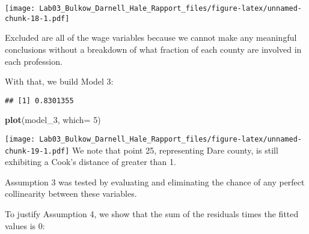 \documentclass[]{article}
\newenvironment{Shaded}{\begin{snugshade}}{\end{snugshade}}
\newcommand{\KeywordTok}[1]{\textcolor[rgb]{0.13,0.29,0.53}{\textbf{#1}}}
\newcommand{\DataTypeTok}[1]{\textcolor[rgb]{0.13,0.29,0.53}{#1}}
\newcommand{\DecValTok}[1]{\textcolor[rgb]{0.00,0.00,0.81}{#1}}
\newcommand{\StringTok}[1]{\textcolor[rgb]{0.31,0.60,0.02}{#1}}
\newcommand{\CommentTok}[1]{\textcolor[rgb]{0.56,0.35,0.01}{\textit{#1}}}
\newcommand{\OperatorTok}[1]{\textcolor[rgb]{0.81,0.36,0.00}{\textbf{#1}}}
\newcommand{\NormalTok}[1]{#1}
\begin{document}
\texttt{[image: Lab03\_Bulkow\_Darnell\_Hale\_Rapport\_files/figure-latex/unnamed-chunk-18-1.pdf]}

Excluded are all of the wage variables because we cannot make any
meaningful conclusions without a breakdown of what fraction of each
county are involved in each profession.

With that, we build Model 3:

\begin{Shaded}
\end{Shaded}

\begin{verbatim}
## [1] 0.8301355
\end{verbatim}

\begin{Shaded}
\begin{Highlighting}[]
\KeywordTok{plot}\NormalTok{(model_}\DecValTok{3}\NormalTok{, }\DataTypeTok{which=} \DecValTok{5}\NormalTok{)}
\end{Highlighting}
\end{Shaded}

\texttt{[image: Lab03\_Bulkow\_Darnell\_Hale\_Rapport\_files/figure-latex/unnamed-chunk-19-1.pdf]}
We note that point 25, representing Dare county, is still exhibiting a
Cook's distance of greater than 1.

Assumption 3 was tested by evaluating and eliminating the chance of any
perfect collinearity between these variables.

To justify Assumption 4, we show that the sum of the residuals times the
fitted values is 0:
\end{document}
